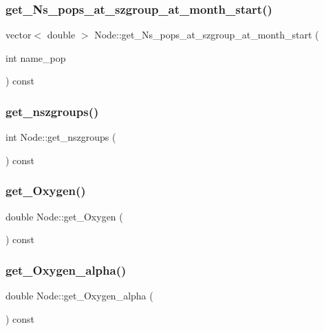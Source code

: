 \subsubsection{\texorpdfstring{get\_Ns\_pops\_at\_szgroup\_at\_month\_start()}{get\_Ns\_pops\_at\_szgroup\_at\_month\_start()}}
{\footnotesize\ttfamily vector$<$ double $>$ Node\+::get\+\_\+\+Ns\+\_\+pops\+\_\+at\+\_\+szgroup\+\_\+at\+\_\+month\+\_\+start (\begin{DoxyParamCaption}\item[{int}]{name\+\_\+pop }\end{DoxyParamCaption}) const}

\mbox{\label{class_node_a156883cb765d9d1d7a66defcdd90a309}} 
\subsubsection{\texorpdfstring{get\_nszgroups()}{get\_nszgroups()}}
{\footnotesize\ttfamily int Node\+::get\+\_\+nszgroups (\begin{DoxyParamCaption}{ }\end{DoxyParamCaption}) const\hspace{0.3cm}{\ttfamily [inline]}}

\mbox{\label{class_node_abe2434f3e1e0847c386a25aa281f2076}} 
\subsubsection{\texorpdfstring{get\_Oxygen()}{get\_Oxygen()}}
{\footnotesize\ttfamily double Node\+::get\+\_\+\+Oxygen (\begin{DoxyParamCaption}{ }\end{DoxyParamCaption}) const}

\mbox{\label{class_node_af9f2d5ea4bc513e2dbe9b2a2c41a0f0a}} 
\subsubsection{\texorpdfstring{get\_Oxygen\_alpha()}{get\_Oxygen\_alpha()}}
{\footnotesize\ttfamily double Node\+::get\+\_\+\+Oxygen\+\_\+alpha (\begin{DoxyParamCaption}{ }\end{DoxyParamCaption}) const}

